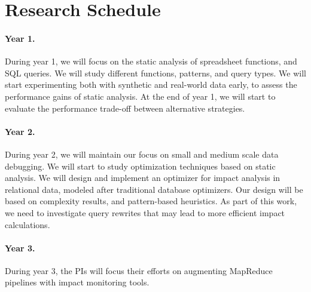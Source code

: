 \section{Research Schedule} %
\label{sec:research_schedule}

\paragraph{Year 1.} %
\label{par:year_1}
During year 1, we will focus on the static analysis of spreadsheet functions, and SQL queries. We will study different functions, patterns, and query types. We will start experimenting both with synthetic and real-world data early, to assess the performance gains of static analysis.  At the end of year 1, we will start to evaluate the performance trade-off between alternative strategies.

\paragraph{Year 2.} %
\label{par:year_2}
During year 2, we will maintain our focus on small and medium scale data debugging. We will start to study optimization techniques based on static analysis. We will design and implement an optimizer for impact analysis in relational data, modeled after traditional database optimizers. Our design will be based on complexity results, and pattern-based heuristics.
As part of this work, we need to investigate query rewrites that may lead to more efficient impact calculations.

\paragraph{Year 3.} %
\label{par:year_3}
During year 3, the PIs will focus their efforts on augmenting MapReduce pipelines with impact monitoring tools. 

